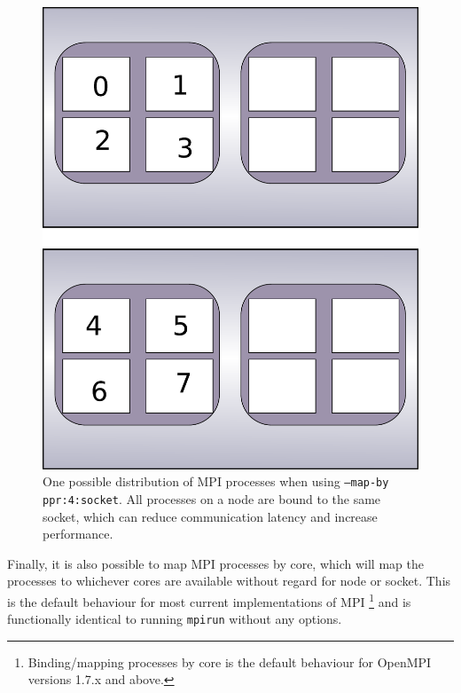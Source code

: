 \documentclass{report}
\begin{document}
\begin{figure}
\label{fig:MPI_map-by_socket}
\centering
\includegraphics[height = 0.5\textheight]{MPI_map-by_socket.pdf}
\caption{One possible distribution of MPI processes when using \texttt{--map-by ppr:4:socket}. All
processes on a node are bound to the same socket, which can reduce communication latency and increase
performance.}
\end{figure}

Finally, it is also possible to map MPI processes by core, which will map the processes to whichever
cores are available without regard for node or socket. This is the default behaviour for most
current implementations of MPI \footnote{Binding/mapping processes by core is the default behaviour for
OpenMPI versions 1.7.x and above.} and is functionally identical to running \texttt{mpirun} without any
options.
\end{document}

